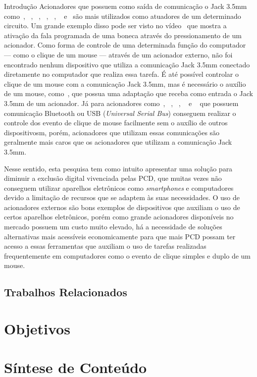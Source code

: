 \begin{chapter}{Introdução}
Acionadores que possuem como saída de comunicação o Jack 3.5mm
como~\cite{CandyCorn}, ~\cite{PalPad}, ~\cite{JellyBean}, ~\cite{Chin}, ~\cite{
MicroLight}, ~\cite{HoneyBee} e~\cite{StringSwitch} são mais utilizados como
atuadores de um determinado circuito. Um grande exemplo disso pode ser visto
no vídeo~\cite{ATswitchYT} que mostra a ativação da fala programada de uma
boneca através do pressionamento de um acionador. Como forma de controle de uma
determinada função do computador --- como o clique de um mouse --- através de um 
acionador externo, não foi encontrado nenhum dispositivo que utiliza a comunicação Jack 3.5mm conectado
diretamente no computador que realiza essa tarefa. É até possível controlar o
clique de um mouse com a comunicação Jack 3.5mm, mas é necessário o auxílio de
um mouse, como~\cite{MouseJack}, que possua uma adaptação que receba como
entrada o Jack 3.5mm de um acionador. Já para acionadores
como~\cite{Blue2}, ~\cite{SavantElite2}, ~\cite{FootPedal}, ~\cite{FootSwitch} e
~\cite{SipPuff} que possuem comunicação Bluetooth ou USB (\textit{Universal
Serial Bus}) conseguem realizar o controle dos evento de clique de mouse
facilmente sem o auxílio de outros dispositivosm, porém, acionadores que
utilizam essas comunicações são geralmente mais caros que os acionadores que
utilizam a comunicação Jack 3.5mm.

Nesse sentido, esta pesquisa tem como intuito apresentar uma solução para
diminuir a exclusão digital vivenciada pelas PCD, que muitas vezes não conseguem
utilizar aparelhos eletrônicos como \textit{smartphones} e computadores devido a 
limitação de recursos que se adaptem às suas necessidades. O uso de
acionadores externos são bons exemplos de dispositivos que auxiliam o uso de certos
aparelhos eletrônicos, porém como grande acionadores disponíveis no mercado 
possuem um custo muito elevado, há a necessidade de soluções alternativas mais
acessíveis economicamente para que mais PCD possam ter acesso a essas
ferramentas que auxiliam o uso de tarefas realizadas frequentemente em
computadores como o evento de clique simples e duplo de um mouse.  

\subsection{Trabalhos Relacionados}



\section{Objetivos}

\section{Síntese de Conteúdo}


\end{chapter}
